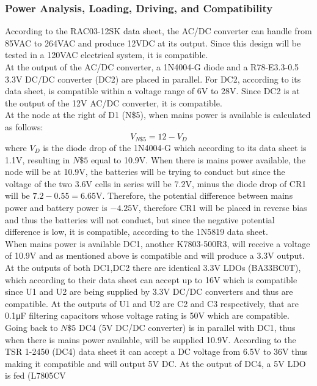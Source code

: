 \subsubsection{Power Analysis, Loading, Driving, and Compatibility}
According to the RAC03-12SK data sheet\cite{RAC0312SK}, the AC/DC converter can handle from 85\si{\V}AC to 264\si{\V}AC and produce 12\si{\V}DC at its output. Since this design will be tested in a 120\si{\V}AC electrical system, it is compatible.\\ At the output of the AC/DC converter, a 1N4004-G diode\cite{1N4004G} and a R78-E3.3-0.5 3.3\si{\V} DC/DC converter\cite{R78E330} (DC2) are placed in parallel. For DC2, according to its data sheet, is compatible within a voltage range of 6\si{\V} to 28\si{\V}. Since DC2 is at the output of the 12\si{\V} AC/DC converter, it is compatible.\\ At the node at the right of D1 (N\$5), when mains power is available is calculated as follows:
\begin{equation}
  V_{N\$5} = 12 -  V_{D}
  \label{eq:mains-batt-node-eqation-mains-available}
\end{equation}
where $V_{D}$ is the diode drop of the 1N4004-G which according to its data sheet is 1.1\si{\V}, resulting in $N\$5$ equal to 10.9\si{\V}. When there is mains power available, the node will be at 10.9\si{\V}, the batteries will be trying to conduct but since the voltage of the two 3.6\si{\V} cells in series will be 7.2\si{\V}, minus the diode drop of CR1\cite{1N5819} will be $7.2 - 0.55 = 6.65\si{\V}$. Therefore, the potential difference between mains power and battery power is $-4.25\si{\V}$, therefore CR1 will be placed in reverse bias and thus the batteries will not conduct, but since the negative potential difference is low, it is compatible, according to the 1N5819 data sheet\cite{1N5819}.\\ When mains power is available DC1, another K7803-500R3, will receive a voltage of 10.9\si{\V} and as mentioned above is compatible and will produce a 3.3\si{\V} output. At the outputs of both DC1,DC2 there are identical 3.3\si{\V} LDOs (BA33BC0T)\cite{BA33BC0T}, which according to their data sheet can accept up to 16\si{\V} which is compatible since U1 and U2 are being supplied by 3.3\si{\V} DC/DC converters and thus are compatible. At the outputs of U1 and U2 are C2 and C3 respectively, that are 0.1\si{\micro\farad} filtering capacitors whose voltage rating is 50\si{\V} which are compatible.\\ Going back to $N\$5$ DC4 (5\si{\V} DC/DC converter) is in parallel with DC1, thus when there is mains power available, will be supplied 10.9\si{\V}. According to the TSR 1-2450 (DC4) data sheet\cite{TSR12450} it can accept a DC voltage from 6.5\si{\V} to 36\si{\V} thus making it compatible and will output 5\si{\V} DC. At the output of DC4, a 5\si{\V} LDO is fed (L7805CV
